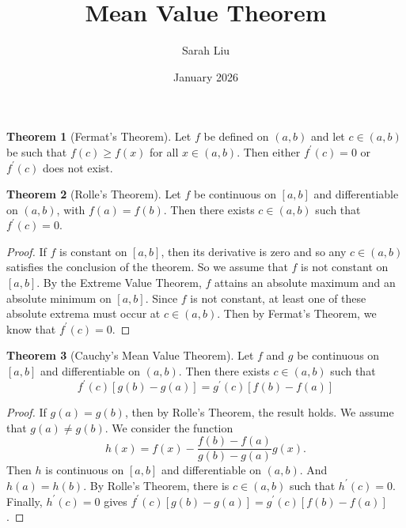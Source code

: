 \documentclass{article}
\title{Mean Value Theorem}
\author{Sarah Liu}
\date{January 2026}
\theoremstyle{definition}
\newtheorem{theorem}{Theorem}[section]
\theoremstyle{remark}
\begin{document}
\maketitle

\begin{theorem}[Fermat's Theorem]
    Let $f$ be defined on $(a,b)$ and let $c\in(a,b)$ be such that $f(c)\geq f(x)$ for all $x\in(a,b)$. Then either $f^{'}(c)=0$ or $f^{'}(c)$ does not exist.
\end{theorem}

\begin{theorem}[Rolle's Theorem]
    Let $f$ be continuous on $[a,b]$ and differentiable on $(a,b)$, with $f(a)=f(b)$. Then there exists $c\in(a,b)$ such that $f^{'}(c)=0$.
\end{theorem}

\begin{proof}
    If $f$ is constant on $[a,b]$, then its derivative is zero and so any $c\in(a,b)$ satisfies the conclusion of the theorem.
    So we assume that $f$ is not constant on $[a,b]$.
    By the Extreme Value Theorem, $f$ attains an absolute maximum and an absolute minimum on $[a,b]$.
    Since $f$ is not constant, at least one of these absolute extrema must occur at $c\in(a,b)$.
    Then by Fermat's Theorem, we know that $f^{'}(c)=0$.
\end{proof}

\begin{theorem}[Cauchy's Mean Value Theorem]
    Let $f$ and $g$ be continuous on $[a,b]$ and differentiable on $(a,b)$. Then there exists $c\in(a,b)$ such that 
    \[
    f^{'}(c)[g(b)-g(a)]=g^{'}(c)[f(b)-f(a)]
    \]
\end{theorem}

\begin{proof}
    If $g(a)=g(b)$, then by Rolle's Theorem, the result holds.
    We assume that $g(a)\neq g(b)$.
    We consider the function
    \[
    h(x)=f(x)-\frac{f(b)-f(a)}{g(b)-g(a)}g(x).
    \]
    Then $h$ is continuous on $[a,b]$ and differentiable on $(a,b)$.
    And $h(a)=h(b)$.
    By Rolle's Theorem, there is $c\in(a,b)$ such that $h^{'}(c)=0$.
    Finally, $h^{'}(c)=0$ gives $f^{'}(c)[g(b)-g(a)]=g^{'}(c)[f(b)-f(a)]$.
\end{proof}
\end{document}
